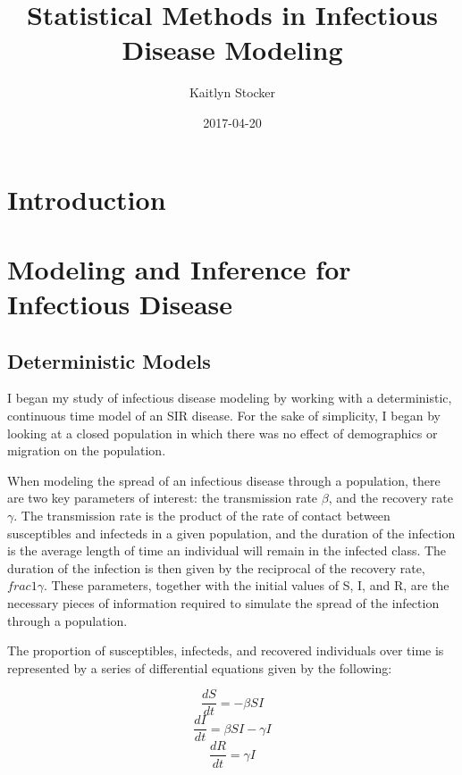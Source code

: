 \documentclass{article}
\title{Statistical Methods in Infectious Disease Modeling}
\date{2017-04-20}
\author{Kaitlyn Stocker}
\begin{document}
\maketitle
{}
\newpage
{}
\tableofcontents
\newpage

\section{Introduction}

\section{Modeling and Inference for Infectious Disease}
\subsection{Deterministic Models} %
I began my study of infectious disease modeling by working with a deterministic, continuous time model of an SIR disease. For the sake of simplicity, I began by looking at a closed population in which there was no effect of demographics or migration on the population. 

When modeling the spread of an infectious disease through a population, there are two key parameters of interest: the transmission rate $\beta$, and the recovery rate $\gamma$. The transmission rate is the product of the rate of contact between susceptibles and infecteds in a given population, and the duration of the infection is the average length of time an individual will remain in the infected class. The duration of the infection is then given by the reciprocal of the recovery rate, $frac{1}{\gamma}$. These parameters, together with the initial values of S, I, and R, are the necessary pieces of information required to simulate the spread of the infection through a population. 

The proportion of susceptibles, infecteds, and recovered individuals over time is represented by a series of differential equations given by the following:

\begin{equation}\frac{dS}{dt} = -\beta SI \end{equation}
\begin{equation}\frac{dI}{dt} = \beta SI - \gamma I \end{equation}
\begin{equation}\frac{dR}{dt} = \gamma I \end{equation}
\end{document}
